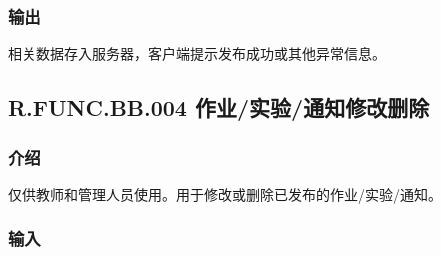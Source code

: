       \subsubsection{输出}
      相关数据存入服务器，客户端提示发布成功或其他异常信息。

    \subsection{R.FUNC.BB.004 作业/实验/通知修改删除}
      \subsubsection{介绍}
      仅供教师和管理人员使用。用于修改或删除已发布的作业/实验/通知。
      \subsubsection{输入}
